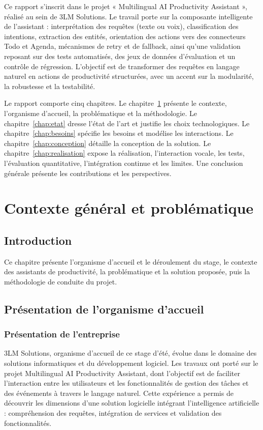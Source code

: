 \documentclass[11pt,a4paper,openany,oneside]{report}
\newcommand{\chapintro}{\section*{Introduction}\phantomsection\addcontentsline{toc}{section}{Introduction}}
\begin{document}
Ce rapport s'inscrit dans le projet « Multilingual AI Productivity Assistant », réalisé au sein de 3LM Solutions. Le travail porte sur la composante intelligente de l'assistant : interprétation des requêtes (texte ou voix), classification des intentions, extraction des entités, orientation des actions vers des connecteurs Todo et Agenda, mécanismes de retry et de fallback, ainsi qu'une validation reposant sur des tests automatisés, des jeux de données d'évaluation et un contrôle de régression. L'objectif est de transformer des requêtes en langage naturel en actions de productivité structurées, avec un accent sur la modularité, la robustesse et la testabilité.

Le rapport comporte cinq chapitres. Le chapitre~\ref{chap:contexte} présente le contexte, l'organisme d'accueil, la problématique et la méthodologie. Le chapitre~\ref{chap:etat} dresse l'état de l'art et justifie les choix technologiques. Le chapitre~\ref{chap:besoins} spécifie les besoins et modélise les interactions. Le chapitre~\ref{chap:conception} détaille la conception de la solution. Le chapitre~\ref{chap:realisation} expose la réalisation, l'interaction vocale, les tests, l'évaluation quantitative, l'intégration continue et les limites. Une conclusion générale présente les contributions et les perspectives.

\chapter{Contexte général et problématique}\label{chap:contexte}
\chapintro
Ce chapitre présente l'organisme d'accueil et le déroulement du stage, le contexte des assistants de productivité, la problématique et la solution proposée, puis la méthodologie de conduite du projet.

\section{Présentation de l'organisme d'accueil}
\subsection{Présentation de l'entreprise}
3LM Solutions, organisme d'accueil de ce stage d'été, évolue dans le domaine des solutions informatiques et du développement logiciel. Les travaux ont porté sur le projet Multilingual AI Productivity Assistant, dont l'objectif est de faciliter l'interaction entre les utilisateurs et les fonctionnalités de gestion des tâches et des événements à travers le langage naturel. Cette expérience a permis de découvrir les dimensions d'une solution logicielle intégrant l'intelligence artificielle : compréhension des requêtes, intégration de services et validation des fonctionnalités.
\end{document}
